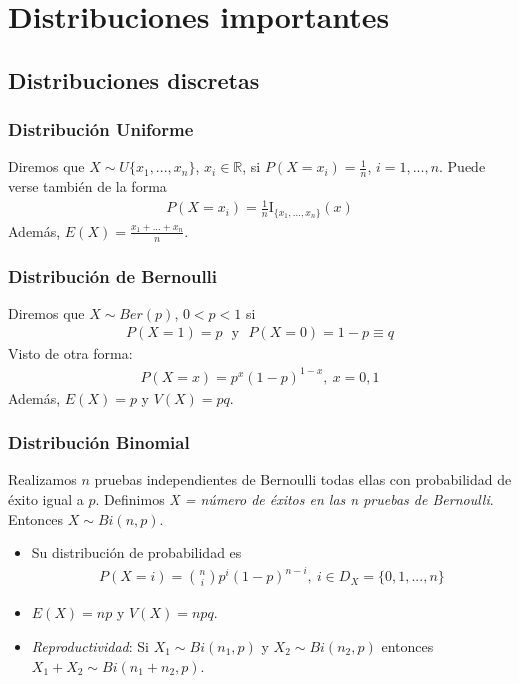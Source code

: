\setcounter{chapter}{-1}
\chapter{Distribuciones importantes}

\section{Distribuciones discretas}

\subsection{Distribución Uniforme}
Diremos que $X \sim U\{x_1,...,x_n\}$, $x_i \in \mathbb{R}$, si $P(X = x_i) = \frac{1}{n}$, $i = 1,...,n$. Puede verse también de la forma
\begin{align*}
    P(X = x_i) = \frac{1}{n}\text{I}_{\{x_1,...,x_n\}}(x)
\end{align*}
Además, $E(X) = \frac{x_1 + ... + x_n}{n}$.

\subsection{Distribución de Bernoulli}
Diremos que $X \sim Ber(p)$, $0 < p < 1$ si
\begin{align*}
    P(X = 1) = p \ \ \ \text{y} \ \ \ P(X = 0) = 1 - p \equiv q
\end{align*}
Visto de otra forma:
\begin{align*}
    P(X = x) = p^x(1 - p)^{1-x}, \ x = 0,1
\end{align*}
Además, $E(X) = p$ y $V(X) = pq$.

\subsection{Distribución Binomial}
Realizamos $n$ pruebas independientes de Bernoulli todas ellas con probabilidad de éxito igual a $p$.
\newline
Definimos \textit{X = número de éxitos en las n pruebas de Bernoulli}. Entonces $X \sim Bi(n,p)$.
\begin{itemize}
    \item Su distribución de probabilidad es
    \begin{align*}
    P(X = i) = \binom{n}{i}p^i(1-p)^{n-i}, \ i \in D_X = \{0,1,...,n\} 
\end{align*}
    \item $E(X) = np$ y $V(X) = npq$.
    \item \textit{Reproductividad}: Si $X_1 \sim Bi(n_1,p)$ y $X_2 \sim Bi(n_2,p)$ entonces $X_1 + X_2 \sim Bi(n_1 + n_2, p)$.
\end{itemize}


